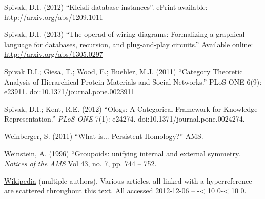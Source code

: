 \begin{thebibliography}{SGWB}
 Spivak, D.I. (2012) ``Kleisli database instances''. ePrint available: \url{http://arxiv.org/abs/1209.1011}

 Spivak, D.I. (2013) ``The operad of wiring diagrams: Formalizing a graphical language for databases, recursion, and plug-and-play circuits.'' Available online: \url{http://arxiv.org/abs/1305.0297}

 Spivak D.I.; Giesa, T.; Wood, E.; Buehler, M.J. (2011) ``Category Theoretic Analysis of Hierarchical Protein Materials and Social Networks.'' PLoS ONE 6(9): e23911. doi:10.1371/journal.pone.0023911

 Spivak, D.I.; Kent, R.E. (2012) ``Ologs: A Categorical Framework for Knowledge Representation.'' \textit{PLoS ONE} 7(1): e24274. doi:10.1371/journal.pone.0024274.

 Weinberger, S. (2011) ``What is... Persistent Homology?'' AMS.

 Weinstein, A. (1996) ``Groupoids: unifying internal and external symmetry. \textit{Notices of the AMS} Vol 43, no. 7, pp. 744 -- 752.

 \href{http://www.wikipedia.org}{\text Wikipedia} (multiple authors). Various articles, all linked with a hyperreference are scattered throughout this text. All accessed 2012-12-06 -- \the \year-{\ifnum \month < 10 0\the\month \else \the\month \fi}-{\ifnum \day < 10 0\the\day \else \the\day \fi}.

\end{thebibliography}

